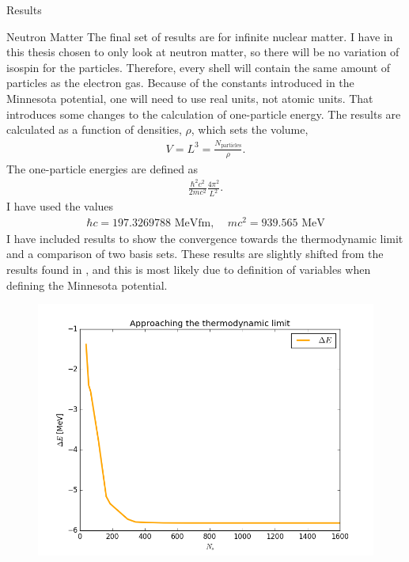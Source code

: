 \documentclass[twoside,english]{uiofysmaster}
\begin{document}
\begin{chapter}{Results}
	\begin{section}{Neutron Matter}
    The final set of results are for infinite nuclear matter. I have in this thesis chosen to only look at neutron matter, so there will be no variation of isospin for the particles. Therefore, every shell will contain the same amount of particles as the electron gas. Because of the constants introduced in the Minnesota potential, one will need to use real units, not atomic units. That introduces some changes to the calculation of one-particle energy. The results are calculated as a function of densities, $\rho$, which sets the volume, 
    \begin{align}
      V = L^3 = \frac{N_{\text{particles}}}{\rho}. 
    \end{align}
    The one-particle energies are defined as
    \begin{align}
      \frac{\hbar ^2 c^2}{2mc^2} \frac{4\pi^2}{L^2}. 
    \end{align}
    I have used the values 
    \begin{align}
      \hbar c = 197.3269788 \text{ MeVfm}, \:\:\:\:\: m c^2 = 939.565 \text{ MeV}
    \end{align}
    I have included results to show the convergence towards the thermodynamic limit and a comparison of two basis sets. These results are slightly shifted from the results found in \cite{Hjorth-Jensen2016}, and this is most likely due to definition of variables when defining the Minnesota potential. 
    \begin{figure}[]
      \includegraphics[width=\textwidth]{../NuclearMatter/Results/Figures/Thermodynamic_limit.png}

\end{figure}
\end{section}
\end{chapter}
\end{document}

